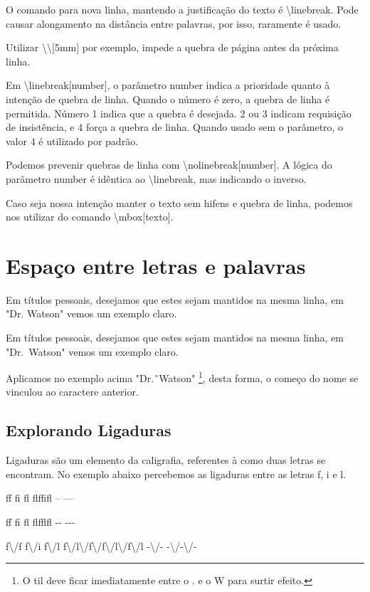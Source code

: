 O comando para nova linha, mantendo a justificação do texto é \textbackslash linebreak.
Pode causar alongamento na distância entre palavras, por isso, raramente é usado.

Utilizar \textbackslash\textbackslash*[5mm] por exemplo, impede a quebra de página antes da próxima linha.

Em \textbackslash linebreak[number], o parâmetro number indica a prioridade quanto à intenção de quebra de linha.
Quando o número é zero, a quebra de linha é permitida.
Número 1 indica que a quebra é desejada.
2 ou 3 indicam requisição de insistência, e 4 força a quebra de linha.
Quando usado sem o parâmetro, o valor 4 é utilizado por padrão.

Podemos prevenir quebras de linha com \textbackslash nolinebreak[number].
A lógica do parâmetro number é idêntica ao \textbackslash linebreak, mas indicando o inverso.

Caso seja nossa intenção manter o texto sem hifens e quebra de linha, podemos nos utilizar do comando \textbackslash mbox[texto].

\section{Espaço entre letras e palavras}
Em títulos pessoais, desejamos que estes sejam mantidos na mesma linha, em "Dr. Watson" vemos um exemplo claro.

Em títulos pessoais, desejamos que estes sejam mantidos na mesma linha, em "Dr.~Watson" vemos um exemplo claro.

Aplicamos no exemplo acima "Dr.\~\ Watson"
\footnote{O til deve ficar imediatamente entre o . e o W para surtir efeito.}, desta forma, o começo do nome se vinculou ao caractere anterior.

\subsection{Explorando Ligaduras}
Ligaduras são um elemento da caligrafia, referentes à como duas letras se encontram.
No exemplo abaixo percebemos as ligaduras entre as letras f, i e l.

ff fi fl flffifl -- ---

f\/f f\/i f\/l f\/l\/f\/f\/l\/f\/l -\/- -\/-\/-

f\textbackslash/f f\textbackslash/i f\textbackslash/l
f\textbackslash/l\textbackslash/f\textbackslash/f\textbackslash/l\textbackslash/f\textbackslash/l
-\textbackslash/-
-\textbackslash/-\textbackslash/-

